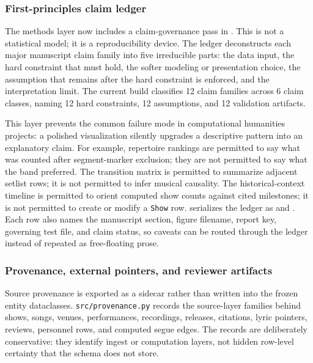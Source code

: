 \documentclass[
]{article}
\begin{document}
\subsubsection{First-principles claim
ledger}\label{first-principles-claim-ledger}

The methods layer now includes a claim-governance pass in
. This is not a statistical
model; it is a reproducibility device. The ledger deconstructs each
major manuscript claim family into five irreducible parts: the data
input, the hard constraint that must hold, the softer modeling or
presentation choice, the assumption that remains after the hard
constraint is enforced, and the interpretation limit. The current build
classifies 12 claim families across 6 claim classes, naming 12 hard
constraints, 12 assumptions, and 12 validation artifacts.

This layer prevents the common failure mode in computational humanities
projects: a polished visualization silently upgrades a descriptive
pattern into an explanatory claim. For example, repertoire rankings are
permitted to say what was counted after segment-marker exclusion; they
are not permitted to say what the band preferred. The transition matrix
is permitted to summarize adjacent setlist rows; it is not permitted to
infer musical causality. The historical-context timeline is permitted to
orient computed show counts against cited milestones; it is not
permitted to create or modify a \texttt{Show} row.
 serializes the ledger
as  and
. Each row also
names the manuscript section, figure filename, report key, governing
test file, and claim status, so caveats can be routed through the ledger
instead of repeated as free-floating prose.

\subsubsection{Provenance, external pointers, and reviewer
artifacts}\label{provenance-external-pointers-and-reviewer-artifacts}

Source provenance is exported as a sidecar rather than written into the
frozen entity dataclasses. \texttt{src/provenance.py} records the
source-layer families behind shows, songs, venues, performances,
recordings, releases, citations, lyric pointers, reviews, personnel
rows, and computed segue edges. The records are deliberately
conservative: they identify ingest or computation layers, not hidden
row-level certainty that the schema does not store.
\end{document}
